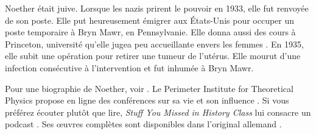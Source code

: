 \documentclass[../../../include/open-logic-section]{subfiles}
\begin{document}
Noether était
juive. Lorsque
les nazis
prirent le
pouvoir en 1933,
elle fut
renvoyée
de son poste.
Elle put
heureusement
émigrer aux
États-Unis
pour occuper
un poste
temporaire
à Bryn Mawr,
en Pennsylvanie.
Elle donna
aussi des cours
à Princeton,
université
qu'elle jugea
peu accueillante
envers les femmes
\citep[81]{Dick1981}.
En 1935,
elle subit
une opération
pour retirer
une tumeur
de l'utérus.
Elle mourut
d'une infection
consécutive
à l'intervention
et fut
inhumée
à Bryn Mawr.

\begin{reading}
Pour une biographie
de Noether,
voir \citet{Dick1981}.
Le Perimeter
Institute for
Theoretical Physics
propose en ligne
des conférences
sur sa vie
et son influence
\citep{Perimeter2015}.
Si vous préférez
écouter plutôt
que lire,
\emph{Stuff You
Missed in History
Class} lui
consacre un
podcast
\citep{Frey2015}.
Ses œuvres
complètes sont
disponibles
dans l'original
allemand
\citep{Noether1983}.
\end{reading}
\end{document}
